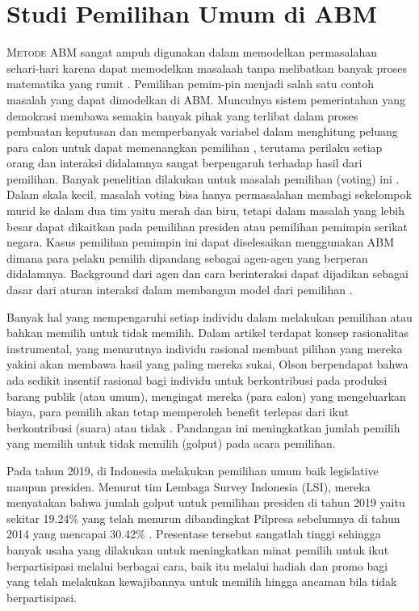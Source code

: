 \section{Studi Pemilihan Umum di ABM}

\lettrine[nindent=-0.01em,findent=0.2em]{M}{etode} ABM sangat ampuh digunakan dalam memodelkan permasalahan sehari-hari karena dapat memodelkan masalaah tanpa melibatkan banyak proses matematika yang rumit \cite{crooks2018agent}. Pemilihan pemim-pin menjadi salah satu contoh masalah yang dapat dimodelkan di ABM. Munculnya sistem pemerintahan yang demokrasi membawa semakin banyak pihak yang terlibat dalam proses pembuatan keputusan dan memperbanyak variabel dalam menghitung peluang para calon untuk dapat memenangkan pemilihan \cite{feddersen2004rational}, terutama perilaku setiap orang dan interaksi didalamnya sangat berpengaruh terhadap hasil dari pemilihan. Banyak penelitian dilakukan untuk masalah pemilihan (voting) ini \cite{feddersen2004rational,saaty1989group}. Dalam skala kecil, masalah voting bisa hanya permasalahan membagi sekelompok murid ke dalam dua tim yaitu  merah dan biru, tetapi dalam masalah yang lebih besar dapat dikaitkan pada pemilihan presiden atau pemilihan pemimpin serikat negara. Kasus pemilihan pemimpin ini dapat diselesaikan menggunakan ABM dimana para pelaku pemilih dipandang sebagai agen-agen yang berperan didalamnya. Background dari agen dan cara berinteraksi dapat dijadikan sebagai dasar  dari aturan interaksi dalam membangun model dari pemilihan \cite{kazil2020utilizing}.

Banyak hal yang mempengaruhi setiap individu dalam melakukan pemilihan atau bahkan memilih untuk tidak memilih. Dalam artikel \cite{olson2012logic} terdapat konsep rasionalitas instrumental, yang menurutnya individu rasional membuat pilihan yang mereka yakini akan membawa hasil yang paling mereka sukai, Olson berpendapat bahwa ada sedikit insentif rasional bagi individu untuk berkontribusi pada produksi barang publik (atau umum), mengingat mereka (para calon) yang mengeluarkan biaya, para pemilih akan tetap memperoleh benefit terlepas dari ikut berkontribusi (suara) atau tidak \cite{savigny_2014}. Pandangan ini meningkatkan jumlah pemilih yang memilih untuk tidak memilih (golput) pada acara pemilihan.

Pada tahun 2019, di Indonesia melakukan pemilihan umum baik legislative maupun presiden. Menurut tim Lembaga Survey Indonesia (LSI), mereka menyatakan bahwa jumlah golput untuk pemilihan presiden di tahun 2019 yaitu sekitar 19.24\% yang telah menurun dibandingkat Pilpresa sebelumnya di tahun 2014 yang mencapai 30.42\% \cite{bbc_2019}. Presentase tersebut sangatlah tinggi sehingga banyak usaha yang dilakukan untuk meningkatkan minat pemilih untuk ikut berpartisipasi melalui berbagai cara, baik itu melalui hadiah dan promo bagi yang telah melakukan kewajibannya untuk memilih hingga ancaman bila tidak berpartisipasi.

